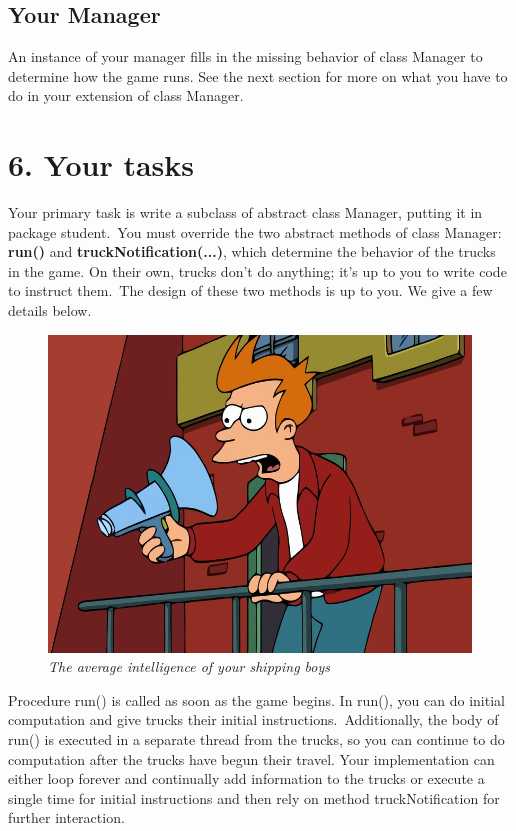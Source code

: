 \documentclass[11pt]{article}
\begin{document}
\subsection{Your Manager}
An instance of your manager fills in the missing behavior of class Manager to determine how the game runs. See the next section for more on what you have to do in your extension of class Manager.

\section{6. Your tasks}
Your primary task is write a subclass of abstract class Manager, putting it in package student.\ You must override the two abstract methods of class Manager: \textbf{run()} and \textbf{truckNotification(...)}, which determine the behavior of the trucks in the game. On their own, trucks don't do anything; it's up to you to write code to instruct them.\ The
design of these two methods is up to you. We give a few details below.\\

\begin{figure}[h]
\centerline{\includegraphics[scale=0.32]{fry.jpg}} 
\caption{\em{The average intelligence of your shipping boys}}
\end{figure}

Procedure run() is called as soon as the game begins. In run(), you can do initial computation and give trucks their initial instructions.\ Additionally, the body of run() is executed in a separate thread from the trucks, so you can continue to do computation after the trucks have begun their travel. Your implementation can either loop forever and continually add information to the trucks or execute a single time for initial instructions and then rely on method truckNotification for further interaction.\\
\end{document}
